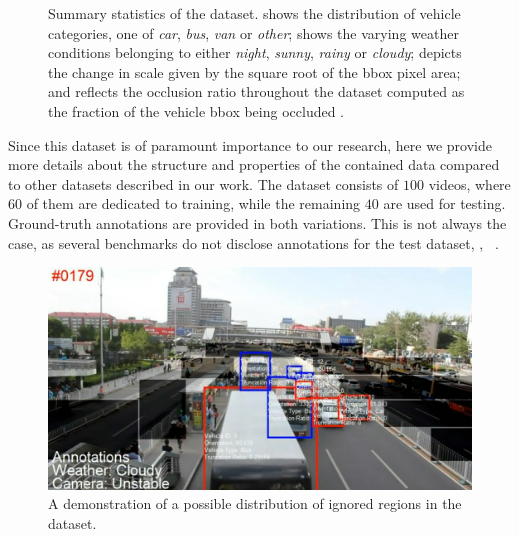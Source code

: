 \begin{figure}[t]
\begin{subfigure}[b]{\uadetracfigsize\textwidth}
        \caption[]{}
    \end{subfigure}
    \caption[\uadetrac{} dataset overview]{Summary statistics of the \uadetrac{} dataset.  shows the distribution of vehicle categories, one of \emph{car}, \emph{bus}, \emph{van} or \emph{other};  shows the varying weather conditions belonging to either \emph{night}, \emph{sunny}, \emph{rainy} or \emph{cloudy};  depicts the change in scale given by the square root of the \gls{bbox} pixel area; and  reflects the occlusion ratio throughout the dataset computed as the fraction of the vehicle \gls{bbox} being occluded . }
    \label{fig:UADETRACStats}
\end{figure}

Since this dataset is of paramount importance to our research, here we provide more details about the structure and properties of the contained data compared to other datasets described in our work. The dataset consists of $100$ videos, where $60$ of them are dedicated to training, while the remaining $40$ are used for testing. Ground-truth annotations are provided in both variations. This is not always the case, as several benchmarks do not disclose annotations for the test dataset, \egtext{}, ~\cite{geiger2012cvpr}.

\begin{figure}[t]
    \centerline{\includegraphics[width=0.8\linewidth]{figures/datasets/uadetrac_ignored_regions.png}}
    \caption[Ignored regions in \uadetrac{}]{A demonstration of a possible distribution of ignored regions in the \uadetrac{} dataset. }
    \label{fig:UADETRACIgnoredRegions}
\end{figure}

